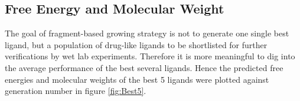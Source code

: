\documentclass[10pt,conference,letterpaper]{IEEEtran}
\begin{document}

\subsection{Free Energy and Molecular Weight}
The goal of fragment-based growing strategy is not to generate one single best ligand, but a population of drug-like ligands to be shortlisted for further verifications by wet lab experiments.
Therefore it is more meaningful to dig into the average performance of the best several ligands.
Hence the predicted free energies and molecular weights of the best 5 ligands were plotted against generation number in figure \ref{fig:Best5}.
\end{document}
